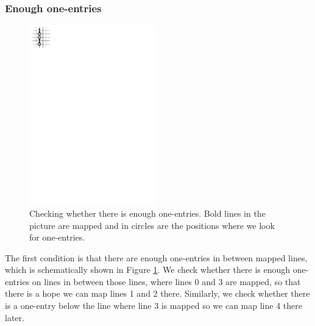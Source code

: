 \subsubsection{Enough one-entries}
\begin{figure}[h!]
\centering
\includegraphics[width=55mm]{../img/enough_one-entries.pdf}
\caption{Checking whether there is enough one-entries. Bold lines in the picture are mapped and in circles are the positions where we look for one-entries.}
\label{enough}
\end{figure}
The first condition is that there are enough one-entries in between mapped lines, which is schematically shown in Figure \ref{enough}. We check whether there is enough one-entries on lines in between those lines, where lines 0 and 3 are mapped, so that there is a hope we can map lines 1 and 2 there. Similarly, we check whether there is a one-entry below the line where line 3 is mapped so we can map line 4 there later.
